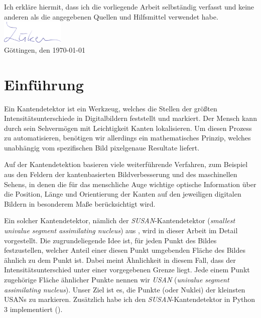 \documentclass[a4paper, 11pt]{report}
\renewcommand{\emph}[1]{\textit{#1}}
\theoremstyle{definition}
\begin{document}
\pagebreak

\noindent Ich erkläre hiermit, dass ich die vorliegende Arbeit selbständig verfasst und keine anderen als die angegebenen Quellen und Hilfsmittel verwendet habe.\\[0.7em]
\phantom{H}\includegraphics[height=3em]{sign.png}\\[0.5em]
Göttingen, den \today \hspace{2em}

\pagebreak
\restoregeometry
{}
\setcounter{page}{0}
\tableofcontents

\pagebreak

\restoregeometry

\pagestyle{headings}

\chapter{Einführung}
	Ein Kantendetektor ist ein Werkzeug, welches die Stellen der größten Intensitätsunterschiede in Digitalbildern feststellt und markiert. Der Mensch kann durch sein Sehvermögen mit Leichtigkeit Kanten lokalisieren. Um diesen Prozess zu automatisieren, benötigen wir allerdings ein mathematisches Prinzip, welches unabhängig vom spezifischen Bild pixelgenaue Resultate liefert.

	Auf der Kantendetektion basieren viele weiterführende Verfahren, zum Beispiel aus den Feldern der kantenbasierten Bildverbesserung und des maschinellen Sehens, in denen die für das menschliche Auge wichtige optische Information über die Position, Länge und Orientierung der Kanten auf den jeweiligen digitalen Bildern in besonderem Maße berücksichtigt wird.

	Ein solcher Kantendetektor, nämlich der \emph{SUSAN}-Kantendetektor (\emph{smallest univalue segment assimilating nucleus}) aus \cite{SUSAN}, wird in dieser Arbeit im Detail vorgestellt. Die zugrundeliegende Idee ist, für jeden Punkt des Bildes festzustellen, welcher Anteil einer diesen Punkt umgebenden Fläche des Bildes \glqq ähnlich\grqq{} zu dem Punkt ist. Dabei meint \glqq Ähnlichkeit\grqq{} in diesem Fall, dass der Intensitätsunterschied unter einer vorgegebenen Grenze liegt. Jede einem Punkt zugehörige Fläche ähnlicher Punkte nennen wir \emph{USAN} (\emph{univalue segment assimilating nucleus}). Unser Ziel ist es, die Punkte (oder Nuklei) der kleinsten USANs zu markieren. Zusätzlich habe ich den \emph{SUSAN}-Kantendetektor in Python 3 implementiert (\cite{mysoftware}).
\end{document}
